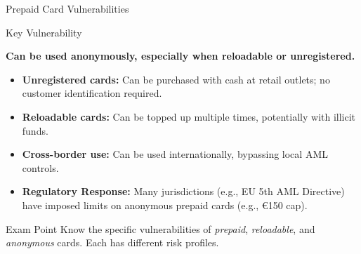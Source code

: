 \documentclass{beamer}
\begin{document}
	\begin{frame}{Prepaid Card Vulnerabilities}
		\begin{block}{Key Vulnerability}
			\begin{center}
				\textbf{Can be used anonymously, especially when reloadable or unregistered.}
			\end{center}
		\end{block}
		\begin{itemize}
			\item \textbf{Unregistered cards:} Can be purchased with cash at retail outlets; no customer identification required.
			\item \textbf{Reloadable cards:} Can be topped up multiple times, potentially with illicit funds.
			\item \textbf{Cross-border use:} Can be used internationally, bypassing local AML controls.
			\item \textbf{Regulatory Response:} Many jurisdictions (e.g., EU 5th AML Directive) have imposed limits on anonymous prepaid cards (e.g., €150 cap).
		\end{itemize}
		\begin{alertblock}{Exam Point}
			Know the specific vulnerabilities of \textit{prepaid}, \textit{reloadable}, and \textit{anonymous} cards. Each has different risk profiles.
		\end{alertblock}
	\end{frame}
	
\end{document}
